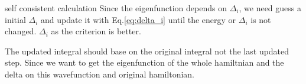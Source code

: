 \documentclass[a4paper,11pt]{article}
\begin{document}
    self consistent calculation
    Since the eigenfunction depends on $\Delta_i$, we need guess a initial
    $\Delta_i$ and update it with Eq.\eqref{eq:delta_i} until the energy or
    $\Delta_i$ is not changed. $\Delta_i$ as the criterion is better.
    
    The updated integral should base on the original integral not the last
    updated step. Since we want to get the eigenfunction of the whole
    hamiltnian and the delta on this wavefunction and original hamiltonian.
    

    
\end{document}
